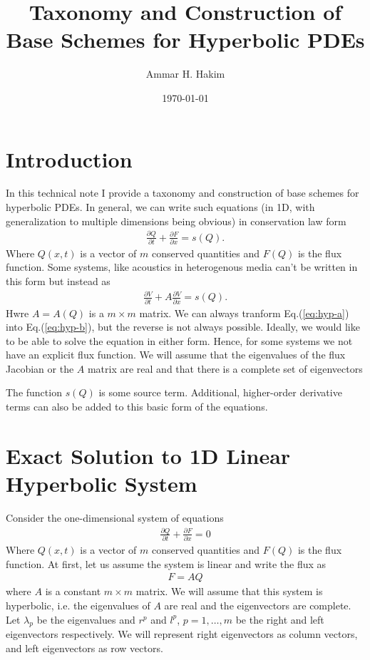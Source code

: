 \documentclass[12pt]{article}
\title{Taxonomy and Construction of Base Schemes for Hyperbolic PDEs}%
\author{Ammar H. Hakim}%
\date{\today}
\theoremstyle{definition}
\theoremstyle{definition}
\theoremstyle{definition}
\newcommand{\eqr}[1]{Eq.\thinspace(#1)}
\newcommand{\pfrac}[2]{\frac{\partial #1}{\partial #2}}
\begin{document}
\maketitle

\tableofcontents

\section{Introduction}

In this technical note I provide a taxonomy and construction of base
schemes for hyperbolic PDEs. In general, we can write such equations
(in 1D, with generalization to multiple dimensions being obvious) in
conservation law form
\begin{align}
  \pfrac{Q}{t} + \pfrac{F}{x} = s(Q). \label{eq:hyp-a}
\end{align}
Where $Q(x,t)$ is a vector of $m$ conserved quantities and $F(Q)$ is
the flux function.  Some systems, like acoustics in heterogenous media
can't be written in this form but instead as
\begin{align}
  \pfrac{V}{t} + A \pfrac{V}{x} = s(Q). \label{eq:hyp-b}
\end{align}
Hwre $A = A(Q)$ is a $m \times m$ matrix. We can always tranform
\eqr{\ref{eq:hyp-a}} into \eqr{\ref{eq:hyp-b}}, but the reverse is not
always possible. Ideally, we would like to be able to solve the
equation in either form. Hence, for some systems we not have an
explicit flux function. We will assume that the eigenvalues of the
flux Jacobian or the $A$ matrix are real and that there is a complete
set of eigenvectors

The function $s(Q)$ is some source term. Additional, higher-order
derivative terms can also be added to this basic form of the
equations.

\section{Exact Solution to 1D Linear Hyperbolic System}

Consider the one-dimensional system of equations
\begin{align}
\pfrac{Q}{t} + \pfrac{F}{x} = 0 \label{eq:hyp1}
\end{align}
Where $Q(x,t)$ is a vector of $m$ conserved quantities and $F(Q)$ is
the flux function. At first, let us assume the system is linear and
write the flux as
\begin{align}
F = A Q
\end{align}
where $A$ is a constant $m\times m$ matrix. We will assume that this
system is hyperbolic, i.e. the eigenvalues of $A$ are real and the
eigenvectors are complete. Let $\lambda_p$ be the eigenvalues and
$r^p$ and $l^p$, $p=1,\ldots,m$ be the right and left eigenvectors
respectively. We will represent right eigenvectors as column vectors,
and left eigenvectors as row vectors.
\end{document}

